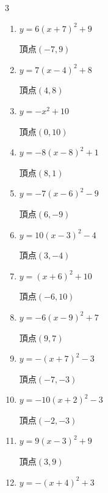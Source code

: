 \begin{multicols}{3}
\begin{enumerate}
        $\displaystyle 頂点\left( 4 , -9 \right)$

  \item $\displaystyle y=6\left( x+7\right)^{2}+9$

        $\displaystyle 頂点\left( -7 , 9 \right)$

\columnbreak %

  \item $\displaystyle y=7\left( x-4\right)^{2}+8$

        $\displaystyle 頂点\left( 4 , 8 \right)$

  \item $\displaystyle y=-x^{2}+10$

        $\displaystyle 頂点\left( 0 , 10 \right)$

  \item $\displaystyle y=-8\left( x-8\right)^{2}+1$

        $\displaystyle 頂点\left( 8 , 1 \right)$

  \item $\displaystyle y=-7\left( x-6\right)^{2}-9$

        $\displaystyle 頂点\left( 6 , -9 \right)$

  \item $\displaystyle y=10\left( x-3\right)^{2}-4$

        $\displaystyle 頂点\left( 3 , -4 \right)$

  \item $\displaystyle y=\left( x+6\right)^{2}+10$

        $\displaystyle 頂点\left( -6 , 10 \right)$

  \item $\displaystyle y=-6\left( x-9\right)^{2}+7$

        $\displaystyle 頂点\left( 9 , 7 \right)$

  \item $\displaystyle y=-\left( x+7\right)^{2}-3$

        $\displaystyle 頂点\left( -7 , -3 \right)$

  \item $\displaystyle y=-10\left( x+2\right)^{2}-3$

        $\displaystyle 頂点\left( -2 , -3 \right)$

  \item $\displaystyle y=9\left( x-3\right)^{2}+9$

        $\displaystyle 頂点\left( 3 , 9 \right)$

  \item $\displaystyle y=-\left( x+4\right)^{2}+3$


\end{enumerate}
\end{multicols}
